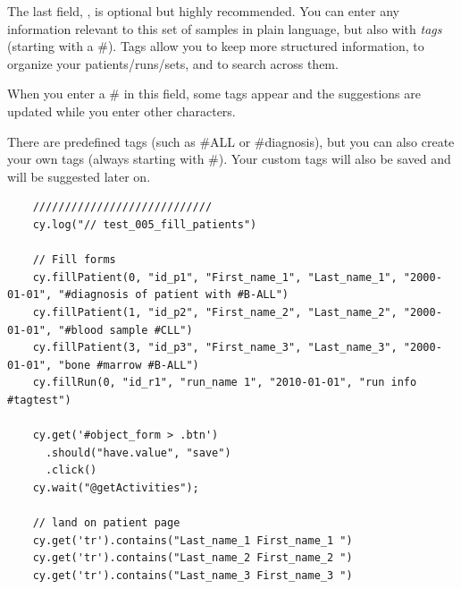 The last field, ,
is optional but highly recommended.
You can enter any information relevant to this set of samples
in plain language, but also with \emph{tags} (starting with a \#).
Tags allow you to keep more structured information,
to organize your patients/runs/sets, and to search across them.

When you enter a \# in this field, some tags appear and the
suggestions are  updated while you enter other characters.

There are predefined tags (such as \#ALL or \#diagnosis),
but you can also create your own tags (always starting with \#).
Your custom tags will also be saved and will be suggested later on.

\begin{verbatim}
    ////////////////////////////
    cy.log("// test_005_fill_patients")

    // Fill forms
    cy.fillPatient(0, "id_p1", "First_name_1", "Last_name_1", "2000-01-01", "#diagnosis of patient with #B-ALL")
    cy.fillPatient(1, "id_p2", "First_name_2", "Last_name_2", "2000-01-01", "#blood sample #CLL")
    cy.fillPatient(3, "id_p3", "First_name_3", "Last_name_3", "2000-01-01", "bone #marrow #B-ALL")
    cy.fillRun(0, "id_r1", "run_name 1", "2010-01-01", "run info #tagtest")

    cy.get('#object_form > .btn')
      .should("have.value", "save")
      .click()
    cy.wait("@getActivities");

    // land on patient page
    cy.get('tr').contains("Last_name_1 First_name_1 ")
    cy.get('tr').contains("Last_name_2 First_name_2 ")
    cy.get('tr').contains("Last_name_3 First_name_3 ")

\end{verbatim}





